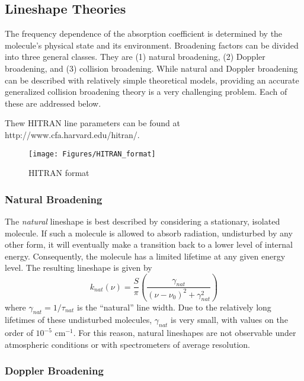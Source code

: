 \documentclass[11pt]{article}
\begin{document}
\subsection{Lineshape Theories}\label{sec:shapetheory}

The frequency dependence of the absorption coefficient is determined by the 
molecule's physical state and its environment.  Broadening factors can be 
divided into three general classes.  They are (1) natural broadening,
(2) Doppler broadening, and (3) collision broadening.  While natural and 
Doppler broadening can be described with relatively simple theoretical
models, providing an accurate generalized collision broadening theory is a 
very challenging problem.  Each of these are addressed below.

Thew HITRAN line parameters can be found at 
http://www.cfa.harvard.edu/hitran/. 
\begin{figure}[h]
  \begin{center}\texttt{[image: Figures/HITRAN\_format]}\end{center}
  \caption{HITRAN format}
  \label{fig:hitran}
\end{figure}

\subsubsection{Natural Broadening}\label{sec:natural}

The {\it natural} lineshape is best described by considering a stationary,
isolated molecule. If such a molecule is allowed to absorb radiation,
undisturbed by any other form, it will eventually make a transition back 
to a lower level of internal energy.  Consequently, the molecule has a 
limited lifetime at any given energy level.  The resulting lineshape is 
given by
\begin{equation}
 k_{nat}(\nu)=\frac{S}{\pi}\left(\frac{\gamma_{nat}}
{(\nu-\nu_{0})^{2}+\gamma_{nat}^{2}}\right)
\end{equation}
where $\gamma_{nat}=1/\tau_{nat}$ is the ``natural'' line width.  Due to
the relatively long lifetimes of these undisturbed molecules, 
$\gamma_{nat}$ is very small, with values on the order of
$10^{-5}$ cm$^{-1}$.  For this reason, natural lineshapes are not 
observable 
under atmospheric conditions or with spectrometers of average resolution.

\subsubsection{Doppler Broadening}\label{sec:doppler}
\end{document}
